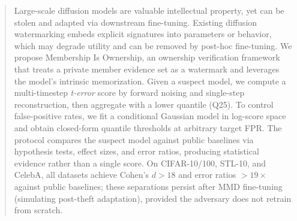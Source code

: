 \documentclass{article}
\begin{document}

\printAffiliationsAndNotice{}

\begin{abstract}
Large-scale diffusion models are valuable intellectual property, yet can be stolen and adapted via downstream fine-tuning.
Existing diffusion watermarking embeds explicit signatures into parameters or behavior, which may degrade utility and can be removed by post-hoc fine-tuning.
We propose {Membership Is Ownership}, an ownership verification framework that treats a private member evidence set as a watermark and leverages the model's intrinsic memorization.
Given a suspect model, we compute a multi-timestep \emph{t-error} score by forward noising and single-step reconstruction, then aggregate with a lower quantile (Q25).
To control false-positive rates, we fit a conditional Gaussian model in log-score space and obtain closed-form quantile thresholds at arbitrary target FPR.
The protocol compares the suspect model against public baselines via hypothesis tests, effect sizes, and error ratios, producing statistical evidence rather than a single score.
On CIFAR-10/100, STL-10, and CelebA, all datasets achieve Cohen's $d > 18$ and error ratios $> 19\times$ against public baselines; these separations persist after MMD fine-tuning (simulating post-theft adaptation), provided the adversary does not retrain from scratch.
\end{abstract}

\end{document}
